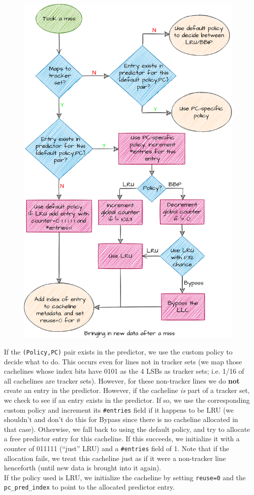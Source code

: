 \documentclass[11pt, swedish, openany]{book}
\begin{document}
\begin{figure}[H]
    \centering
    \includegraphics[width=0.6\linewidth]{images/newcacheline.png}
\end{figure}
If the \texttt{(Policy,PC)} pair exists in the predictor, we use the custom policy to decide what to do. This occurs even for lines not in tracker sets (we map those cachelines whose index bits have 0101 as the 4 LSBs as tracker sets; i.e. 1/16 of all cachelines are tracker sets). However, for these non-tracker lines we do \textbf{not} create an entry in the predictor. However, if the cacheline \textit{is} part of a tracker set, we check to see if an entry exists in the predictor. If so, we use the corresponding custom policy and increment its \texttt{\#entries} field if it happens to be LRU (we shouldn't and don't do this for Bypass since there is no cacheline allocated in that case). Otherwise, we fall back to using the default policy, and try to allocate a free predictor entry for this cacheline. If this succeeds, we initialize it with a counter of 011111 (``just'' LRU) and a \texttt{\#entries} field of 1. Note that if the allocation fails, we treat this cacheline just as if it were a non-tracker line henceforth (until new data is brought into it again).\\
If the policy used is LRU, we initialize the cacheline by setting \texttt{reuse=0} and the \texttt{pc\_pred\_index} to point to the allocated predictor entry.\\
\end{document}
